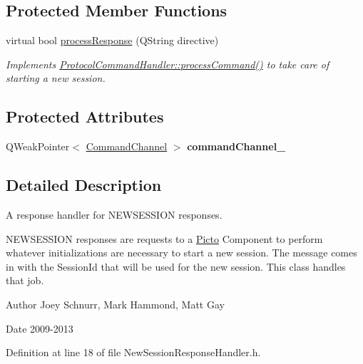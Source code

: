 \subsection*{Protected Member Functions}
\begin{DoxyCompactItemize}
\item 
virtual bool \hyperlink{struct_picto_1_1_new_session_response_handler_a67dfb302f5c8769f09d058aa01348d69}{process\-Response} (Q\-String directive)
\begin{DoxyCompactList}\small\item\em Implements \hyperlink{struct_picto_1_1_protocol_command_handler_aeeaa16fe40f10fd55996d74e16e29cad}{Protocol\-Command\-Handler\-::process\-Command()} to take care of starting a new session. \end{DoxyCompactList}\end{DoxyCompactItemize}
\subsection*{Protected Attributes}
\begin{DoxyCompactItemize}
\item 
\hypertarget{struct_picto_1_1_new_session_response_handler_a0a0dbe0a4b8698dab1d3f134100680d4}{Q\-Weak\-Pointer$<$ \hyperlink{class_picto_1_1_command_channel}{Command\-Channel} $>$ {\bfseries command\-Channel\-\_\-}}\label{struct_picto_1_1_new_session_response_handler_a0a0dbe0a4b8698dab1d3f134100680d4}

\end{DoxyCompactItemize}


\subsection{Detailed Description}
A response handler for N\-E\-W\-S\-E\-S\-S\-I\-O\-N responses. 

N\-E\-W\-S\-E\-S\-S\-I\-O\-N responses are requests to a \hyperlink{namespace_picto}{Picto} Component to perform whatever initializations are necessary to start a new session. The message comes in with the Session\-Id that will be used for the new session. This class handles that job. \begin{DoxyAuthor}{Author}
Joey Schnurr, Mark Hammond, Matt Gay 
\end{DoxyAuthor}
\begin{DoxyDate}{Date}
2009-\/2013 
\end{DoxyDate}


Definition at line 18 of file New\-Session\-Response\-Handler.\-h.



